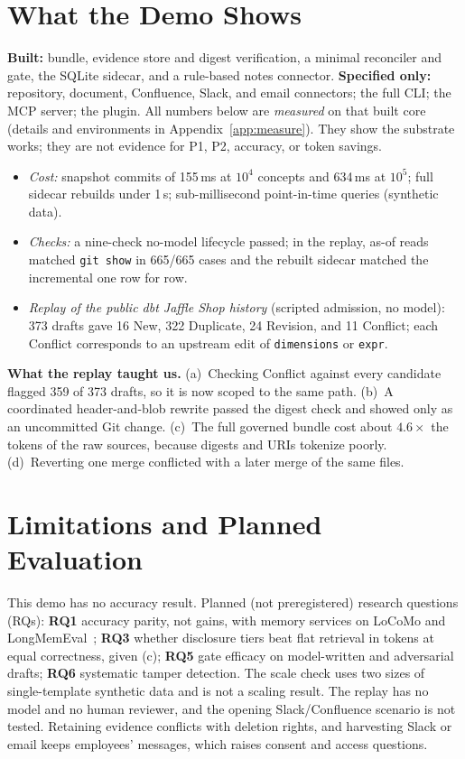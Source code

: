 \documentclass[conference,letterpaper]{IEEEtran}
\begin{document}
\section{What the Demo Shows}\label{sec:eval}
\textbf{Built:} bundle, evidence store and digest verification, a minimal reconciler and gate, the SQLite sidecar, and a rule-based notes connector. \textbf{Specified only:} repository, document, Confluence, Slack, and email connectors; the full CLI; the MCP server; the plugin. All numbers below are \emph{measured} on that built core (details and environments in Appendix~\ref{app:measure}). They show the substrate works; they are not evidence for P1, P2, accuracy, or token savings.
\begin{itemize}
\item \emph{Cost:} snapshot commits of 155\,ms at $10^4$ concepts and 634\,ms at $10^5$; full sidecar rebuilds under 1\,s; sub-millisecond point-in-time queries (synthetic data).
\item \emph{Checks:} a nine-check no-model lifecycle passed; in the replay, as-of reads matched \texttt{git show} in 665/665 cases and the rebuilt sidecar matched the incremental one row for row.
\item \emph{Replay of the public dbt Jaffle Shop history} (scripted admission, no model): 373 drafts gave 16 New, 322 Duplicate, 24 Revision, and 11 Conflict; each Conflict corresponds to an upstream edit of \texttt{dimensions} or \texttt{expr}.
\end{itemize}

\textbf{What the replay taught us.} (a)~Checking Conflict against every candidate flagged 359 of 373 drafts, so it is now scoped to the same path. (b)~A coordinated header-and-blob rewrite passed the digest check and showed only as an uncommitted Git change. (c)~The full governed bundle cost about $4.6\times$ the tokens of the raw sources, because digests and URIs tokenize poorly. (d)~Reverting one merge conflicted with a later merge of the same files.

\section{Limitations and Planned Evaluation}\label{sec:disc}
This demo has no accuracy result. Planned (not preregistered) research questions (RQs): \textbf{RQ1} accuracy parity, not gains, with memory services on LoCoMo and LongMemEval~\cite{locomo,longmemeval}; \textbf{RQ3} whether disclosure tiers beat flat retrieval in tokens at equal correctness, given (c); \textbf{RQ5} gate efficacy on model-written and adversarial drafts; \textbf{RQ6} systematic tamper detection. The scale check uses two sizes of single-template synthetic data and is not a scaling result. The replay has no model and no human reviewer, and the opening Slack/Confluence scenario is not tested. Retaining evidence conflicts with deletion rights, and harvesting Slack or email keeps employees' messages, which raises consent and access questions.
\end{document}
